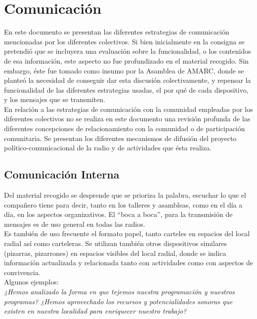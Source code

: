 \chapter{Comunicación\label{Comunica}}

En este documento se presentan las diferentes estrategias de comunicación  mencionadas por los diferentes colectivos. Si bien inicialmente en la consigna se pretendió que se incluyera una evaluación sobre la funcionalidad, o los contenidos de esa información, este aspecto no fue profundizado en el material recogido. Sin embargo, éste fue tomado como insumo por la Asamblea de AMARC, donde se planteó la necesidad de conseguir dar esta discusión colectivamente, y repensar la funcionalidad de las diferentes estrategias usadas, el por qué de cada dispositivo, y los mensajes que se transmiten.\\

En relación a las estrategias de comunicación con la comunidad empleadas por los diferentes colectivos no se realiza en este documento una revisión profunda de las diferentes concepciones de relacionamiento con la comunidad o de participación comunitaria. Se presentan los diferentes mecanismos de difusión del proyecto político-comunicacional de la radio y de actividades que ésta realiza.\\

\section{Comunicación Interna}

Del material recogido se desprende que se prioriza la palabra, escuchar lo que el compañero tiene para decir, tanto en los talleres y asambleas, como en el día a día, en los aspectos organizativos. El “boca a boca”, para la transmisión de mensajes es de uso general en todas las radios.\\

Es también de uso frecuente el formato papel, tanto carteles en espacios del local radial así como carteleras. Se utilizan también otros dispositivos similares (pizarras, pizarrones) en espacios visibles del local radial, donde se indica información actualizada y relacionada tanto con actividades como con aspectos de convivencia.\\

Algunos ejemplos:\\

\textit{¿Hemos analizado la forma en que tejemos nuestra programación y nuestros programas? ¿Hemos aprovechado los recursos y potencialidades sonoras que existen en nuestra localidad para enriquecer nuestro trabajo?}

